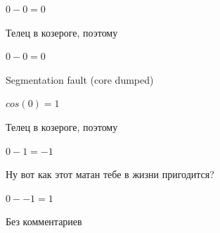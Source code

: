 \documentclass[12pt,a4paper,fleqn]{article}
\begin{document}
\begin{center}
\begin{center}
\begin{center}
\begin{center}
\begin{center}
\begin{center}
\begin{center}
\begin{center}
\begin{center}
\begin{center}
\begin{center}
\begin{center}
\begin{center}
\begin{center}
\begin{center}
\begin{center}
\begin{center}
\begin{center}
\begin{center}
\begin{center}
\begin{center}
\begin{center}
\begin{center}
\begin{center}
\begin{center}
\begin{center}
\begin{center}
\begin{center}
\begin{center}
\begin{center}
\begin{center}
\begin{center}
\begin{center}
\begin{center}
\begin{center}
\begin{center}
\begin{center}
\begin{center}
\begin{center}
\begin{center}
\begin{center}
\begin{center}
\begin{center}
\begin{center}
\begin{center}
\begin{center}
\begin{center}
\begin{center}
\begin{center}
\begin{center}
\begin{center}
\begin{center}
\begin{center}
\begin{center}
\begin{center}
\begin{center}
\begin{center}
\begin{center}
\begin{center}
\begin{center}
\begin{center}
\begin{center}
\begin{center}
\begin{center}
\begin{center}
\begin{center}
\begin{center}
\begin{center}
\begin{center}
\begin{center}
\begin{center}
\begin{center}$0-0 = 0$\end{center}
Телец в козероге, поэтому

\begin{center}
\begin{center}$0-0 = 0$\end{center}
Segmentation fault (core dumped)

\begin{center}
\begin{center}$cos(0) = 1$\end{center}
Телец в козероге, поэтому

\begin{center}
\begin{center}$0-1 = -1$\end{center}
Ну вот как этот матан тебе в жизни пригодится?

\begin{center}
\begin{center}$0--1 = 1$\end{center}
Без комментариев\cite{link4}


\end{center}
\end{center}
\end{center}
\end{center}
\end{center}
\end{center}
\end{center}
\end{center}
\end{center}
\end{center}
\end{center}
\end{center}
\end{center}
\end{center}
\end{center}
\end{center}
\end{center}
\end{center}
\end{center}
\end{center}
\end{center}
\end{center}
\end{center}
\end{center}
\end{center}
\end{center}
\end{center}
\end{center}
\end{center}
\end{center}
\end{center}
\end{center}
\end{center}
\end{center}
\end{center}
\end{center}
\end{center}
\end{center}
\end{center}
\end{center}
\end{center}
\end{center}
\end{center}
\end{center}
\end{center}
\end{center}
\end{center}
\end{center}
\end{center}
\end{center}
\end{center}
\end{center}
\end{center}
\end{center}
\end{center}
\end{center}
\end{center}
\end{center}
\end{center}
\end{center}
\end{center}
\end{center}
\end{center}
\end{center}
\end{center}
\end{center}
\end{center}
\end{center}
\end{center}
\end{center}
\end{center}
\end{center}
\end{center}
\end{center}
\end{center}
\end{document}
